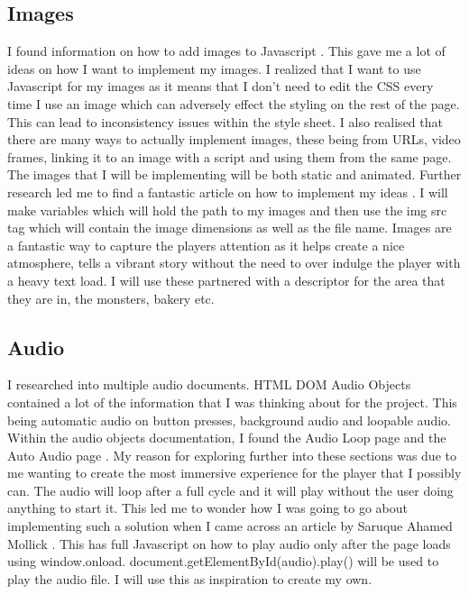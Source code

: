 \documentclass[10pt, a4paper]{article}
\begin{document}
	\subsection{Images}
	I found information on how to add images to Javascript \cite{DOMImage}. This gave me a lot of ideas on how I want to implement my images. I realized that I want to use Javascript for my images as it means that I don't need to edit the CSS every time I use an image which can adversely effect the styling on the rest of the page. This can lead to inconsistency issues within the style sheet. I also realised that there are many ways to actually implement images, these being from URLs, video frames, linking it to an image with a script and using them from the same page. The images that I will be implementing will be both static and animated. Further research led me to find a fantastic article on how to implement my ideas \cite{JavascriptImage}. I will make variables which will hold the path to my images and then use the img src tag which will contain the image dimensions as well as the file name. Images are a fantastic way to capture the players attention as it helps create a nice atmosphere, tells a vibrant story without the need to over indulge the player with a heavy text load. I will use these partnered with a descriptor for the area that they are in, the monsters, bakery etc. 
	
	\subsection{Audio} 
	I researched into multiple audio documents. HTML DOM Audio Objects \cite{DOMAudio} contained a lot of the information that I was thinking about for the project. This being automatic audio on button presses, background audio and loopable audio. Within the audio objects documentation, I found the Audio Loop page \cite{DOMAudioLoop} and the Auto Audio page \cite{DOMAudioAuto}. My reason for exploring further into these sections was due to me wanting to create the most immersive experience for the player that I possibly can. The audio will loop after a full cycle and it will play without the user doing anything to start it. This led me to wonder how I was going to go about implementing such a solution when I came across an article by Saruque Ahamed Mollick \cite{AudioAutoArticle}. This has full Javascript on how to play audio only after the page loads using window.onload. document.getElementById(audio).play() will be used to play the audio file. I will use this as inspiration to create my own.
	
\end{document}
